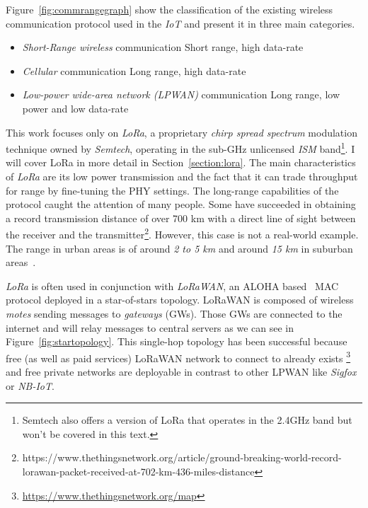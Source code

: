 Figure~\ref{fig:commrangegraph} show the classification
of the existing wireless communication protocol used in the \emph{IoT} and
present it in three main categories.

\begin{itemize}
    \item \emph{Short-Range wireless} communication Short range, high data-rate
    \item \emph{Cellular} communication Long range, high data-rate
    \item \emph{Low-power wide-area network (LPWAN)} communication Long range, low power and low data-rate
\end{itemize}



This work focuses only on \emph{LoRa}, a proprietary \emph{chirp spread spectrum}
modulation technique owned by \emph{Semtech}, operating in the sub-GHz
unlicensed \emph{ISM} band\footnote{Semtech also offers a version of LoRa that
operates in the 2.4GHz band but won't be covered in this text.}. I will cover LoRa 
in more detail in Section~\ref{section:lora}.
The main characteristics of \emph{LoRa} are its low power transmission and the
fact that it can trade throughput for range by fine-tuning the PHY settings.
The long-range capabilities of the protocol caught the attention of
many people. 
Some have succeeded in obtaining a record transmission distance of over 700 km with
a direct line of sight between the receiver and the
transmitter\footnote{https://www.thethingsnetwork.org/article/ground-breaking-world-record-lorawan-packet-received-at-702-km-436-miles-distance}.
However, this case is not a real-world example. The range in urban areas is of
around \emph{2 to 5 km} and around \emph{15 km} in suburban
areas~\cite{8030482}.

\emph{LoRa} is often used in conjunction with \emph{LoRaWAN}, an ALOHA 
based~\cite{loraalliance:lorawanspecification} MAC protocol deployed in a star-of-stars 
topology.
LoRaWAN is composed of wireless \emph{motes} sending messages to \emph{gateways} (GWs).
Those GWs are connected to the internet and will relay messages to central servers
as we can see in Figure~\ref{fig:startopology}.
This single-hop topology has been successful because free (as well as paid
services) LoRaWAN network to connect to already exists
\footnote{\url{https://www.thethingsnetwork.org/map}} and free private networks are
deployable in contrast to other LPWAN like \emph{Sigfox} or \emph{NB-IoT}.

